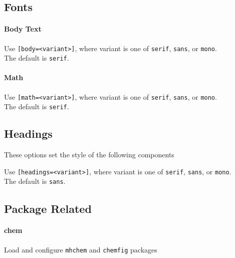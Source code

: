 \documentclass[solid,math,chem,code,plot,gloss]{bmc}
\begin{document}
\subsection{Fonts}
\paragraph{Body Text}
Use \texttt{[body=<variant>]}, where variant is one of  \texttt{serif}, \texttt{sans}, or \texttt{mono}.
\\The default is \texttt{serif}.

\paragraph{Math}
Use \texttt{[math=<variant>]}, where variant is one of  \texttt{serif}, \texttt{sans}, or \texttt{mono}.
\\The default is \texttt{serif}.

\subsection{Headings}

These options set the style of the following components

Use \texttt{[headings=<variant>]}, where variant is one of  \texttt{serif}, \texttt{sans}, or \texttt{mono}.
\\The default is \texttt{sans}.

\subsection{Package Related}

\paragraph{\ttfamily chem}
Load and configure \texttt{mhchem} and \texttt{chemfig} packages
\end{document}
